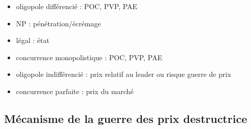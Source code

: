 	
	
	
	\begin{itemize}
		\item oligopole différencié : POC, PVP, PAE
		\item NP : pénétration/écrémage
		\item légal : état
		\item concurrence monopolistique : POC, PVP, PAE
		\item oligopole indifférencié : prix relatif au leader ou risque guerre de prix
		\item concurrence parfaite : prix du marché
	\end{itemize}
	
	\subsection{Mécanisme de la guerre des prix destructrice}
	\begin{comment}
	oligopole -> élasticité croisée élevée -> B perd des ventes, élasticité de réaction élevée -> B réduit ses prix
	marché à maturité -> élasticité de demande globale faible -> élasticité croisée élevée -> élasticité de réaction élevée
	
	[..] -> B perd des ventes -> B réduit ses prix
	\end{comment}
	
	
	
	
	